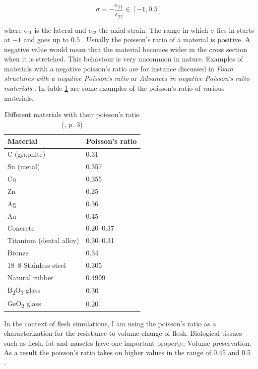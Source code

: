 \begin{equation}\label{eq:poisson}
\sigma = - \frac{\epsilon_{11}}{\epsilon_{22}} \in [-1, 0.5]
\end{equation}

where $\epsilon_{11}$ is the lateral and $\epsilon_{22}$ the axial strain. The range in which $\sigma$ lies in starts at $-1$ and goes up to $0.5$ \cite{PhysRevB.80.132104}. Usually the poisson's ratio of a material is positive. A negative value would mean that the material becomes wider in the cross section when it is stretched. This behaviour is very uncommon in nature. Examples of materials with a negative poisson's ratio are for instance discussed in \textit{Foam structures with a negative Poisson's ratio} \cite{lakes1987foam} or \textit{Advances in negative Poisson's ratio materials} \cite{lakes1993advances}. In table \ref{table:1} are some examples of the poisson's ratio of various materials.

\begin{table}[!htbp]
\centering
    \begin{tabular}{ | l | l |}
    \hline
    \textbf{Material} & \textbf{Poisson's ratio} \\ \hline
    C (graphite) & 0.31 \\ \hline
    Sn (metal) & 0.357 \\ \hline
    Cu & 0.355 \\ \hline
    Zn & 0.25 \\ \hline
    Ag & 0.36 \\ \hline
    Au & 0.45 \\ \hline
    Concrete & 0.20–0.37 \\ \hline
    Titanium (dental alloy) & 0.30–0.31 \\ \hline
    Bronze & 0.34 \\ \hline
    18–8 Stainless steel & 0.305 \\ \hline
    Natural rubber & 0.4999 \\ \hline
	B\textsubscript{2}O\textsubscript{3} glass & 0.30 \\ \hline
	GeO\textsubscript{2} glass & 0.20 \\ \hline	
    \end{tabular}
    \caption[Materials with their poisson's ratio]{Different materials with their poisson's ratio (\cite{PhysRevB.80.132104}, p. 3)}
\label{table:1}
\end{table}

In the context of flesh simulations, I am using the poisson's ratio as a characterization for the resistance to volume change of flesh. Biological tissues such as flesh, fat and muscles have one important property: Volume preservation. As a result the poisson's ratio takes on higher values in the range of 0.45 and 0.5 \cite{Smith:2018:SNF:3191713.3180491}.

